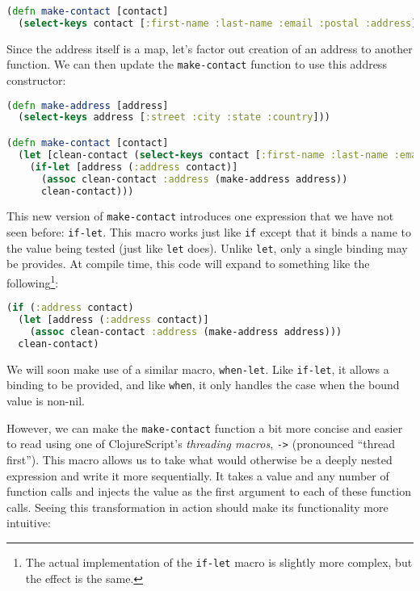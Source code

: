\documentclass[10pt,twoside,openright]{memoir}
\begin{document}
\begin{lstlisting}[language=Clojure]
(defn make-contact [contact]
  (select-keys contact [:first-name :last-name :email :postal :address]))
\end{lstlisting}

Since the address itself is a map, let's factor out creation of an
address to another function. We can then update the
\texttt{make-contact} function to use this address constructor:

\begin{lstlisting}[language=Clojure]
(defn make-address [address]
  (select-keys address [:street :city :state :country]))

(defn make-contact [contact]
  (let [clean-contact (select-keys contact [:first-name :last-name :email])]
    (if-let [address (:address contact)]
      (assoc clean-contact :address (make-address address))
      clean-contact)))
\end{lstlisting}

This new version of \texttt{make-contact} introduces one expression that
we have not seen before: \texttt{if-let}. This macro works just like
\texttt{if} except that it binds a name to the value being tested (just
like \texttt{let} does). Unlike \texttt{let}, only a single binding may
be provides. At compile time, this code will expand to something like
the following\footnote{The actual implementation of the \texttt{if-let}
  macro is slightly more complex, but the effect is the same.}:

\begin{lstlisting}[language=Clojure, caption={\texttt{if-let} transformation}]
(if (:address contact)
  (let [address (:address contact)]
    (assoc clean-contact :address (make-address address)))
  clean-contact)
\end{lstlisting}

We will soon make use of a similar macro, \texttt{when-let}. Like \texttt{if-let}, it allows a binding to be provided, and like \texttt{when}, it only handles the case when the bound value is non-nil.

However, we can make the \texttt{make-contact} function a bit more
concise and easier to read using one of ClojureScript's \emph{threading
macros}, \texttt{-\textgreater{}} (pronounced ``thread first''). This
macro allows us to take what would otherwise be a deeply nested
expression and write it more sequentially. It takes a value and any
number of function calls and injects the value as the first argument to
each of these function calls. Seeing this transformation in action
should make its functionality more intuitive:
\end{document}
